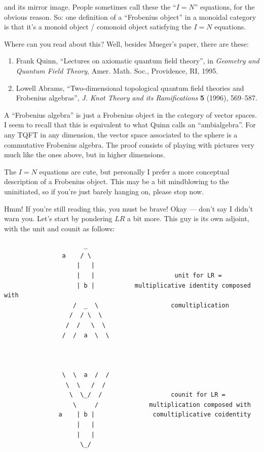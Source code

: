 \documentclass{article}
\begin{document}
and its mirror image. People sometimes call these the ``\(I = N\)''
equations, for the obvious reason. So: one definition of a ``Frobenius
object'' in a monoidal category is that it's a monoid object / comonoid
object satisfying the \(I = N\) equations.

Where can you read about this? Well, besides Mueger's paper, there are
these:

\begin{enumerate}
\def\labelenumi{\arabic{enumi})}
\setcounter{enumi}{3}
\item
  Frank Quinn, ``Lectures on axiomatic quantum field theory'', in
  \emph{Geometry and Quantum Field Theory}, Amer. Math. Soc.,
  Providence, RI, 1995.
\item
  Lowell Abrams, ``Two-dimensional topological quantum field theories
  and Frobenius algebras'', \emph{J. Knot Theory and its Ramifications}
  \textbf{5} (1996), 569--587.
\end{enumerate}

A ``Frobenius algebra'' is just a Frobenius object in the category of
vector spaces. I seem to recall that this is equivalent to what Quinn
calls an ``ambialgebra''. For any TQFT in any dimension, the vector
space associated to the sphere is a commutative Frobenius algebra. The
proof consists of playing with pictures very much like the ones above,
but in higher dimensions.

The \(I = N\) equations are cute, but personally I prefer a more
conceptual description of a Frobenius object. This may be a bit
mindblowing to the uninitiated, so if you're just barely hanging on,
please stop now.

Hmm! If you're still reading this, you must be brave! Okay --- don't say
I didn't warn you. Let's start by pondering \(LR\) a bit more. This guy
is its own adjoint, with the unit and counit as follows:

\begin{verbatim}
                      _
                a    / \      
                    |   |                     
                    |   |                      unit for LR =
                    | b |           multiplicative identity composed with
                   /  _  \                    comultiplication                
                  /  / \  \
                 /  /   \  \
                /  /  a  \  \



                \  \  a  /  /
                 \  \   /  /                 
                  \  \_/  /                   counit for LR =
                   \     /              multiplication composed with 
               a    | b |                comultiplicative coidentity
                    |   |
                    |   |
                     \_/
\end{verbatim}
\end{document}
